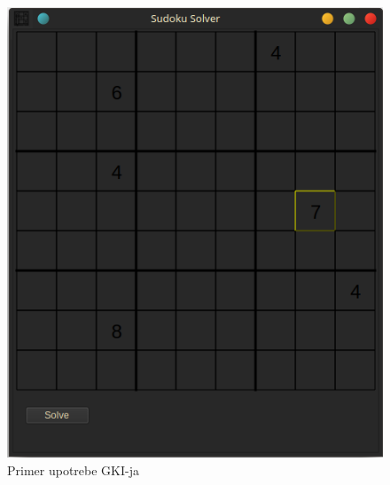 \documentclass[a4paper]{article}
\begin{document}
{\begin{figure}[h!]
\begin{minipage}{0.45\textwidth}
      \includegraphics[width=\linewidth]{slike/app_input.png}
      \caption{Primer upotrebe GKI-ja}
      \label{fig:app_input}
  \end{minipage}
\end{figure}


}
\end{document}
